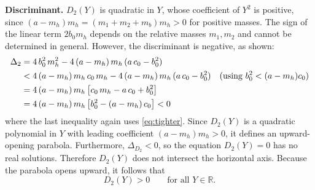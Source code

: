 \documentclass[11pt]{article}
\begin{document}
\medskip
\noindent\textbf{Discriminant.}\quad
$D_2(Y)$ is quadratic in $Y$, whose coefficient of $Y^2$ is positive,
since $(a-m_h)m_h = (m_1+m_2+m_b)m_h > 0$ for positive masses.
The sign of the linear term $2b_0 m_h$ depends on the relative masses $m_1, m_2$
and cannot be determined in general. However, the discriminant is negative,
as shown:
\begin{align}
    \Delta_2 &= 4\,b_0^2\,m_h^2 - 4\,(a-m_h)\,m_h\,(a\,c_0 - b_0^2) \notag\\
                 &< 4\,(a-m_h)\,m_h\,c_0\,m_h - 4\,(a-m_h)\,m_h\,(a\,c_0 - b_0^2)
                    \quad \text{(using } b_0^2 < (a-m_h)c_0 \text{)} \notag\\
                 &= 4\,(a-m_h)\,m_h\,\bigl[c_0\,m_h - a\,c_0 + b_0^2\bigr] \notag\\
                 &= 4\,(a-m_h)\,m_h\,\bigl[b_0^2 - (a-m_h)\,c_0\bigr] < 0
\end{align}
where the last inequality again uses \eqref{eq:tighter}.
Since \(D_2(Y)\) is a quadratic polynomial in \(Y\) with leading coefficient \((a-m_h)m_h>0\), it defines an upward-opening parabola. Furthermore, \(\Delta_{D_2}<0\), so the equation \(D_2(Y)=0\) has no real solutions. Therefore \(D_2(Y)\) does not intersect the horizontal axis. Because the parabola opens upward, it follows that
\begin{equation}
    D_2(Y) > 0 \qquad \text{for all } Y \in \mathbb{R}.
\end{equation}
\end{document}
